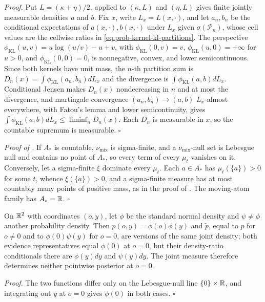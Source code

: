 \noindent\emph{Proof.}
Put $L=(\kappa+\eta)/2$.  applied to $(\kappa,L)$ and $(\eta,L)$
gives finite jointly measurable densities $a$ and $b$. Fix $x$, write $L_x=L(x,\cdot)$, and let $a_n,b_n$ be the
conditional expectations of $a(x,\cdot),b(x,\cdot)$ under $L_x$ given $\sigma(\mathcal P_n)$, whose cell values
are the cellwise ratios in \eqref{eq:prob-kernel-kl-partitions}. The perspective
$\phi_{\mathrm{KL}}(u,v)=u\log(u/v)-u+v$, with $\phi_{\mathrm{KL}}(0,v)=v$, $\phi_{\mathrm{KL}}(u,0)=+\infty$ for
$u>0$, and $\phi_{\mathrm{KL}}(0,0)=0$, is nonnegative, convex, and lower semicontinuous. Since both kernels have
unit mass, the $n$-th partition sum is $D_n(x)=\int\phi_{\mathrm{KL}}(a_n,b_n)dL_x$ and the divergence is
$\int\phi_{\mathrm{KL}}(a,b)dL_x$. Conditional Jensen makes $D_n(x)$ nondecreasing in $n$ and at most the
divergence, and martingale convergence $(a_n,b_n)\to(a,b)$ $L_x$-almost everywhere, with Fatou's lemma and
lower semicontinuity, gives $\int\phi_{\mathrm{KL}}(a,b)dL_x\leq\liminf_nD_n(x)$. Each $D_n$ is measurable in
$x$, so the countable supremum is measurable. \hfill$\square$

\noindent\emph{Proof of .}
If $A_*$ is countable, $\nu_{\mathrm{mix}}$ is sigma-finite, and a $\nu_{\mathrm{mix}}$-null set is Lebesgue null
and contains no point of $A_*$, so every term of every $\mu_t$ vanishes on it. Conversely, let a sigma-finite
$\xi$ dominate every $\mu_t$. Each $a\in A_*$ has $\mu_t(\{a\})>0$ for some $t$, whence $\xi(\{a\})>0$, and a
sigma-finite measure has at most countably many points of positive mass, as in the proof of
. The moving-atom family has $A_*=\mathbb R$. \hfill$\square$

On $\mathbb R^2$ with coordinates $(o,y)$, let $\phi$ be the standard normal density and
$\psi\neq\phi$ another probability density. Then $p(o,y)=\phi(o)\phi(y)$ and $\widetilde p$, equal to $p$ for
$o\neq0$ and to $\phi(0)\psi(y)$ for $o=0$, are versions of the same joint density; both evidence
representatives equal $\phi(0)$ at $o=0$, but their density-ratio conditionals there are $\phi(y)dy$ and
$\psi(y)dy$. The joint measure therefore determines neither pointwise posterior at $o=0$.

\noindent\emph{Proof.}
The two functions differ only on the Lebesgue-null line $\{0\}\times\mathbb R$, and integrating out $y$ at $o=0$
gives $\phi(0)$ in both cases. \hfill$\square$

